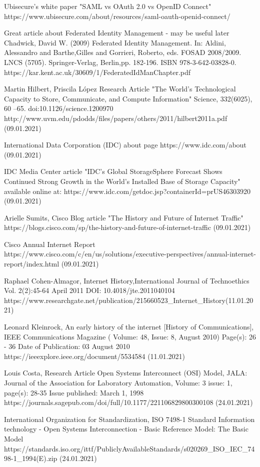 \documentclass[magisterska,en]{pracamgr}
\begin{document}
\begin{thebibliography}{9}
Ubisecure's white paper "SAML vs OAuth 2.0 vs OpenID Connect"
https://www.ubisecure.com/about/resources/saml-oauth-openid-connect/

Great article about Federated Identity Management - may be useful later
Chadwick, David W.  (2009) Federated Identity Management.    In: Aldini, Alessandro and Barthe,Gilles and Gorrieri, Roberto, eds. FOSAD 2008/2009.   LNCS  (5705).  Springer-Verlag, Berlin,pp. 182-196. ISBN 978-3-642-03828-0.
https://kar.kent.ac.uk/30609/1/FederatedIdManChapter.pdf
 
Martin Hilbert, Priscila López
Research Article "The World’s Technological Capacity to Store, Communicate, and Compute Information" Science, 332(6025), 60 –65. doi:10.1126/science.1200970
http://www.uvm.edu/pdodds/files/papers/others/2011/hilbert2011a.pdf (09.01.2021)

International Data Corporation (IDC) about page
https://www.idc.com/about (09.01.2021)

IDC Media Center article "IDC's Global StorageSphere Forecast Shows Continued Strong Growth in the World's Installed Base of Storage Capacity" available online at: https://www.idc.com/getdoc.jsp?containerId=prUS46303920 (09.01.2021)

Arielle Sumits, Cisco Blog article "The History and Future of Internet Traffic"
https://blogs.cisco.com/sp/the-history-and-future-of-internet-traffic (09.01.2021)

Cisco Annual Internet Report
https://www.cisco.com/c/en/us/solutions/executive-perspectives/annual-internet-report/index.html (09.01.2021)

Raphael Cohen-Almagor, Internet History,International Journal of Technoethics Vol. 2(2):45-64
April 2011 
DOI: 10.4018/jte.2011040104
https://www.researchgate.net/publication/215660523\_Internet\_History(11.01.2021)



Leonard Kleinrock, An early history of the internet [History of Communications],  IEEE Communications Magazine ( Volume: 48, Issue: 8, August 2010) Page(s): 26 - 36
Date of Publication: 03 August 2010 
https://ieeexplore.ieee.org/document/5534584 (11.01.2021)
 
 
Louis Costa, Research Article Open Systems Interconnect (OSI) Model, JALA: Journal of the Association for Laboratory Automation, Volume: 3 issue: 1, page(s): 28-35
Issue published: March 1, 1998 
https://journals.sagepub.com/doi/full/10.1177/221106829800300108 (24.01.2021)

International Organization for Standardization, ISO 7498-1 Standard Information technology - Open Systems Interconnection - Basic Reference Model: The Basic Model
https://standards.iso.org/ittf/PubliclyAvailableStandards/s020269\_ISO\_IEC\_7498-1\_1994(E).zip (24.01.2021)
\end{thebibliography}
\end{document}
